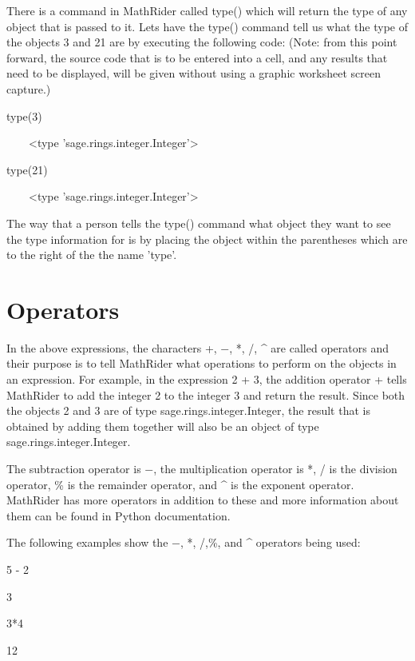 \documentclass[12pt,oneside]{book}
\begin{document}
There is a command in MathRider called type() which will return the type of any object that is passed to it. Lets have the type() command tell us what the type of the objects 3 and 21 are by executing the following code: (Note: from this point forward, the source code that is to be entered into a cell, and any results that need to be displayed, will be given without using a graphic worksheet screen capture.) 

type(3)

{\textbar}

\ \ \ \ {\textless}type 'sage.rings.integer.Integer'{\textgreater}


type(21)

{\textbar}

\ \ \ \ {\textless}type 'sage.rings.integer.Integer'{\textgreater}


The way that a person tells the type() command what object they want to see the type information for is by placing the object within the parentheses which are to the right of the the name 'type'.

\section[Operators]{Operators}

In the above expressions, the characters +, $-$, *, /, \^{} are called operators and their purpose is to tell MathRider what operations to perform on the objects in an expression. For example, in the expression 2 + 3, the addition operator + tells MathRider to add the integer 2 to the integer 3 and return the result. Since both the objects 2 and 3 are of type sage.rings.integer.Integer, the result that is obtained by adding them together will also be an object of type sage.rings.integer.Integer. 

The subtraction operator is $-$, the multiplication operator is *, / is the division operator, \% is the remainder operator, and \^{} is the exponent operator. MathRider has more operators in addition to these and more information about them can be found in Python documentation. 

The following examples show the $-$, *, /,\%, and \^{} operators being used:


5 {}- 2

{\textbar}

3


3*4

{\textbar}

12
\end{document}
